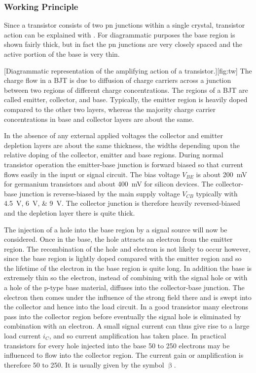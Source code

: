 \subsubsection{Working Principle}
Since a transistor consists of two pn junctions within a single crystal, transistor action can be explained with . For diagrammatic purposes the base region is shown fairly thick, but in fact the pn junctions are very closely spaced and the active portion of the base is very thin.\par
{}[Diagrammatic representation of the amplifying action of a transistor.][fig:tw]
The charge flow in a \ac{BJT} is due to diffusion of charge carriers across a junction between two regions of different charge concentrations. The regions of a BJT are called emitter, collector, and base. Typically, the emitter region is heavily doped compared to the other two layers, whereas the majority charge carrier concentrations in base and collector layers are about the same.\par
In the absence of any external applied voltages the collector and emitter depletion layers are about the same thickness, the widths depending upon the relative doping of the collector, emitter and base regions. During normal transistor operation the emitter-base junction is forward biased so that current flows easily in the input or signal circuit. The bias voltage $V_{BE}$ is about \SI{200}{\milli\volt} for germanium transistors and about \SI{400}{\milli\volt} for silicon devices. The collector-base junction is reverse-biased by the main supply voltage $V_{CB}$ typically with \SIlist{4.5;6;9}{\volt}. The collector junction is therefore heavily reversed-biased and the depletion layer there is quite thick.\par
The injection of a hole into the base region by a signal source will now be considered. Once in the base, the hole attracts an electron from the emitter region. The recombination of the hole and electron is not likely to occur however, since the base region is lightly doped compared with the emitter region and so the lifetime of the electron in the base region is quite long. In addition the base is extremely thin so the electron, instead of combining with the signal hole or with a hole of the p-type base material, diffuses into the collector-base junction. The electron then comes under the influence of the strong field there and is swept into the collector and hence into the load circuit. In a good transistor many electrons pass into the collector region before eventually the signal hole is eliminated by combination with an electron. A small signal current can thus give rise to a large load current $i_{C}$, and so current amplification has taken place. In practical transistors for every hole injected into the base 50 to 250 electrons may be influenced to flow into the collector region. The current gain or amplification is therefore 50 to 250. It is usually given by the symbol $\upbeta$.\par
